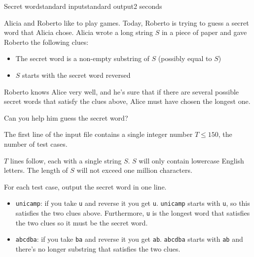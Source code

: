 \begin{problem}{Secret word}{standard input}{standard output}{2 seconds}

Alicia and Roberto like to play games. Today, Roberto is trying to guess a secret word that Alicia chose. Alicia wrote a long string $S$ in a piece of paper and gave Roberto the following clues:

\begin{itemize}
  \item{The secret word is a non-empty substring of $S$ (possibly equal to $S$)}
  \item{$S$ starts with the secret word reversed}
\end{itemize}

Roberto knows Alice very well, and he's sure that if there are several possible secret words that satisfy the clues above, Alice must have chosen the longest one.

Can you help him guess the secret word?

\InputFile

The first line of the input file contains a single integer number $T \leq 150$, the number of test cases.

$T$ lines follow, each with a single string $S$. $S$ will only contain lowercase English letters. The length of $S$ will not exceed one million characters.

\OutputFile

For each test case, output the secret word in one line.

\Example

\begin{example}
%
\end{example}

{\beforeproblemsectioncaption{}\nopagebreak\par\afterproblemsectioncaption}%

\begin{itemize}
  \item{\texttt{unicamp}: if you take \texttt{u} and reverse it you get \texttt{u}. \texttt{unicamp} starts with \texttt{u}, so this satisfies the two clues above. Furthermore, \texttt{u} is the longest word that satisfies the two clues so it must be the secret word.}
  
  \item{\texttt{abcdba}: if you take \texttt{ba} and reverse it you get \texttt{ab}. \texttt{abcdba} starts with \texttt{ab} and there's no longer substring that satisfies the two clues.}
  

\end{itemize}
\end{problem}
